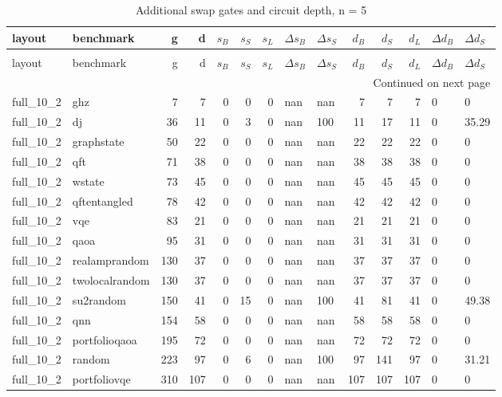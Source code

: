 \begin{longtable}{llrrrrrllrrrll}
\caption{Additional swap gates and circuit depth, n = 5} \label{benchmark-table-5} \\
\toprule
layout & benchmark & g & d & $s_B$ & $s_S$ & $s_L$ & $\Delta s_B$ & $\Delta s_S$ & $d_B$ & $d_S$ & $d_L$ & $\Delta d_B$ & $\Delta d_S$ \\
\midrule
\endfirsthead
\caption[]{Additional swap gates and circuit depth, n = 5} \\
\toprule
layout & benchmark & g & d & $s_B$ & $s_S$ & $s_L$ & $\Delta s_B$ & $\Delta s_S$ & $d_B$ & $d_S$ & $d_L$ & $\Delta d_B$ & $\Delta d_S$ \\
\midrule
\endhead
\midrule
\multicolumn{14}{r}{Continued on next page} \\
\midrule
\endfoot
\bottomrule
\endlastfoot
full\_10\_2 & ghz & 7 & 7 & 0 & 0 & 0 & nan & nan & 7 & 7 & 7 & 0 & 0 \\
full\_10\_2 & dj & 36 & 11 & 0 & 3 & 0 & nan & 100 & 11 & 17 & 11 & 0 & 35.29 \\
full\_10\_2 & graphstate & 50 & 22 & 0 & 0 & 0 & nan & nan & 22 & 22 & 22 & 0 & 0 \\
full\_10\_2 & qft & 71 & 38 & 0 & 0 & 0 & nan & nan & 38 & 38 & 38 & 0 & 0 \\
full\_10\_2 & wstate & 73 & 45 & 0 & 0 & 0 & nan & nan & 45 & 45 & 45 & 0 & 0 \\
full\_10\_2 & qftentangled & 78 & 42 & 0 & 0 & 0 & nan & nan & 42 & 42 & 42 & 0 & 0 \\
full\_10\_2 & vqe & 83 & 21 & 0 & 0 & 0 & nan & nan & 21 & 21 & 21 & 0 & 0 \\
full\_10\_2 & qaoa & 95 & 31 & 0 & 0 & 0 & nan & nan & 31 & 31 & 31 & 0 & 0 \\
full\_10\_2 & realamprandom & 130 & 37 & 0 & 0 & 0 & nan & nan & 37 & 37 & 37 & 0 & 0 \\
full\_10\_2 & twolocalrandom & 130 & 37 & 0 & 0 & 0 & nan & nan & 37 & 37 & 37 & 0 & 0 \\
full\_10\_2 & su2random & 150 & 41 & 0 & 15 & 0 & nan & 100 & 41 & 81 & 41 & 0 & 49.38 \\
full\_10\_2 & qnn & 154 & 58 & 0 & 0 & 0 & nan & nan & 58 & 58 & 58 & 0 & 0 \\
full\_10\_2 & portfolioqaoa & 195 & 72 & 0 & 0 & 0 & nan & nan & 72 & 72 & 72 & 0 & 0 \\
full\_10\_2 & random & 223 & 97 & 0 & 6 & 0 & nan & 100 & 97 & 141 & 97 & 0 & 31.21 \\
full\_10\_2 & portfoliovqe & 310 & 107 & 0 & 0 & 0 & nan & nan & 107 & 107 & 107 & 0 & 0 \\

\end{longtable}
